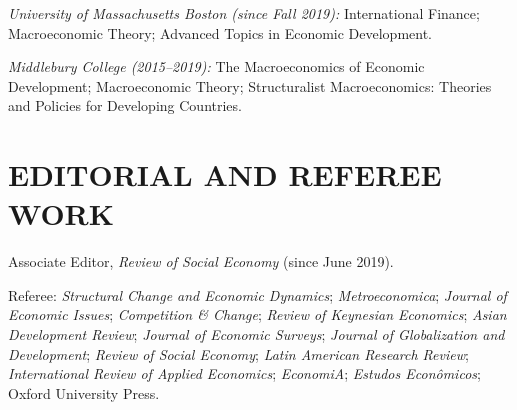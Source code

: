 \documentclass[10pt]{article}
\begin{document}
\textit{University of Massachusetts Boston (since Fall 2019):}
International Finance; Macroeconomic Theory; Advanced Topics in
Economic Development.

\textit{Middlebury College (2015--2019):} The Macroeconomics of
Economic Development; Macroeconomic Theory; Structuralist
Macroeconomics: Theories and Policies for Developing Countries.

\section{EDITORIAL AND REFEREE WORK}

Associate Editor, \textit{Review of Social Economy} (since June 2019).

Referee: \textit{Structural Change and Economic Dynamics};
\textit{Metroeconomica}; \textit{Journal of Economic Issues};
\textit{Competition \& Change}; \textit{Review of Keynesian Economics};
\textit{Asian Development Review}; \textit{Journal of Economic
Surveys}; \textit{Journal of Globalization and Development};
\textit{Review of Social Economy}; \textit{Latin American Research
Review}; \textit{International Review of Applied Economics};
\textit{EconomiA}; \textit{Estudos Econ\^omicos}; Oxford University
Press.
\end{document}
